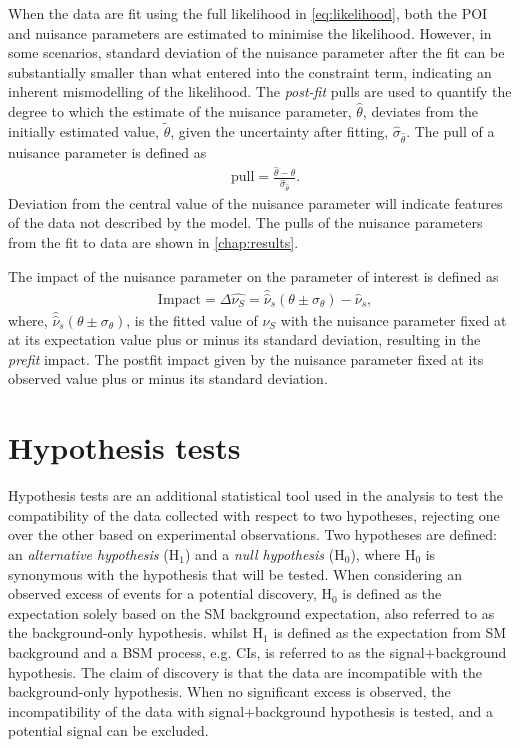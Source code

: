 When the data are fit using the full likelihood in \cref{eq:likelihood}, both the POI and nuisance parameters are estimated to minimise the likelihood. However, in some scenarios, standard deviation of the nuisance parameter after the fit can be substantially smaller than what entered into the constraint term, indicating an inherent mismodelling of the likelihood. The \emph{post-fit} pulls are used to quantify the degree to which the estimate of the nuisance parameter, $\hat{\theta}$, deviates from the initially estimated value, $\tilde{\theta}$, given the uncertainty after fitting, $\hat{\sigma}_{\hat{\theta}}$. The pull of a nuisance parameter is defined as
\begin{equation}
    \label{eq:nppull}
    \begin{aligned}
        & \mathrm{pull} = \frac{\hat{\theta} -{\theta}}{\hat{\sigma}_{\hat{\theta}}}.
    \end{aligned}
\end{equation}
Deviation from the central value of the nuisance parameter will indicate features of the data not described by the model. The pulls of the nuisance parameters from the fit to data are shown in \cref{chap:results}. 

The impact of the nuisance parameter on the parameter of interest is defined as
\begin{equation}
    \label{eq:npinpact}
    \begin{aligned}
        & \mathrm{Impact} = \Delta \hat{\nu_S} = \hat{\hat{\nu}}_s(\theta \pm \sigma_\theta) - \hat{\nu}_s,
    \end{aligned}
\end{equation}
where, $\hat{\hat{\nu}}_s(\theta \pm \sigma_\theta)$, is the fitted value of $\nu_S$ with the nuisance parameter fixed at at its expectation value plus or minus its standard deviation, resulting in the \emph{prefit} impact. The postfit impact given by the nuisance parameter fixed at its observed value plus or minus its standard deviation. 


\section{Hypothesis tests}\label{sec:stats:hypo}
Hypothesis tests are an additional statistical tool used in the analysis to test the compatibility of the data collected with respect to two hypotheses, rejecting one over the other based on experimental observations. Two hypotheses are defined: an \emph{alternative hypothesis} ($\mathrm{H_1}$) and a \emph{null hypothesis} ($\mathrm{H_0}$), where $\mathrm{H}_0$ is synonymous with the hypothesis that will be tested. When considering an observed excess of events for a potential discovery, $\mathrm{H_0}$ is defined as the expectation solely based on the SM background expectation, also referred to as the background-only hypothesis. whilst $\mathrm{H_1}$ is defined as the expectation from SM background and a BSM process, e.g. CIs, is referred to as the signal+background hypothesis. The claim of discovery is that the data are incompatible with the background-only hypothesis. When no significant excess is observed, the incompatibility of the data with signal+background hypothesis is tested, and a potential signal can be excluded. 

